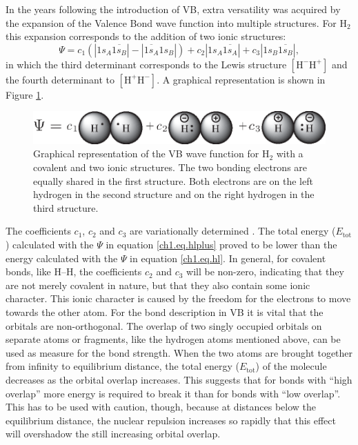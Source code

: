 In the years following the introduction of VB, extra versatility was acquired by the expansion of the Valence Bond wave function into multiple structures. For H$_2$ this expansion corresponds to the addition of two ionic structures:
\begin{equation}
\Psi = c_1 (|1s_{A}\overline{1s_{B}}| - |\overline{1s_{A}}1s_{B}|) + c_2 |1s_{A}\overline{1s_{A}}| + c_3 |1s_{B}\overline{1s_{B}}|,
\label{ch1.eq.hlplus}
\end{equation}
in which the third determinant corresponds to the Lewis structure $\mathrm{[H^{-} H^{+}]}$ and the fourth determinant to $\mathrm{[H^{+} H^{-}]}$. A graphical representation is shown in Figure \ref{ch1.fig.heitlerplus}.
\begin{figure}[htdp]
\center
\includegraphics[scale=1]{introduction/figures/heitlerplus.eps}
\caption{Graphical representation of the VB wave function for $\mathrm{H_2}$ with a covalent and two ionic structures. The two bonding electrons are equally shared in the first structure. Both electrons are on the left hydrogen in the second structure and on the right hydrogen in the third structure.}
\label{ch1.fig.heitlerplus}   
\end{figure}
The coefficients $c_1$, $c_2$ and $c_3$ are variationally determined \cite{varia}. The total energy ($E_\mathrm{tot}$) calculated with the $\Psi$ in equation \ref{ch1.eq.hlplus} proved to be lower than the energy calculated with the $\Psi$ in equation \ref{ch1.eq.hl}. In general, for covalent bonds, like H--H, the coefficients $c_2$ and $c_3$ will be non-zero, indicating that they are not merely covalent in nature, but that they also contain some ionic character. This ionic character is caused by the freedom for the electrons to move towards the other atom. For the bond description in VB it is vital that the orbitals are non-orthogonal. The overlap of two singly occupied orbitals on separate atoms or fragments, like the hydrogen atoms mentioned above, can be used as measure for the bond strength. When the two atoms are brought together from infinity to equilibrium distance, the total energy ($E_\mathrm{tot}$) of the molecule decreases as the orbital overlap increases. This suggests that for bonds with ``high overlap'' more energy is required to break it than for bonds with ``low overlap''. This has to be used with caution, though, because at distances below the equilibrium distance, the nuclear repulsion increases so rapidly that this effect will overshadow the still increasing orbital overlap.

